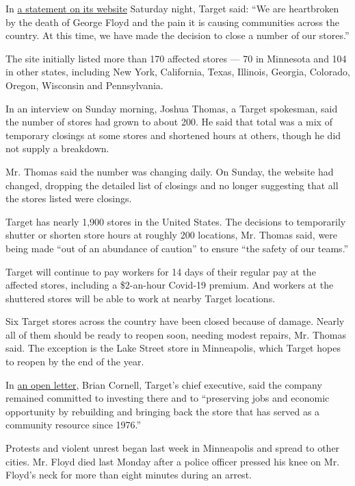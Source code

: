 In
\href{https://corporate.target.com/press/releases/2020/05/an-update-on-temporary-target-store-closures-due-t}{a
statement on its website} Saturday night, Target said: ``We are
heartbroken by the death of George Floyd and the pain it is causing
communities across the country. At this time, we have made the decision
to close a number of our stores.''

The site initially listed more than 170 affected stores --- 70 in
Minnesota and 104 in other states, including New York, California,
Texas, Illinois, Georgia, Colorado, Oregon, Wisconsin and Pennsylvania.

In an interview on Sunday morning, Joshua Thomas, a Target spokesman,
said the number of stores had grown to about 200. He said that total was
a mix of temporary closings at some stores and shortened hours at
others, though he did not supply a breakdown.

Mr. Thomas said the number was changing daily. On Sunday, the website
had changed, dropping the detailed list of closings and no longer
suggesting that all the stores listed were closings.

Target has nearly 1,900 stores in the United States. The decisions to
temporarily shutter or shorten store hours at roughly 200 locations, Mr.
Thomas said, were being made ``out of an abundance of caution'' to
ensure ``the safety of our teams.''

Target will continue to pay workers for 14 days of their regular pay at
the affected stores, including a \$2-an-hour Covid-19 premium. And
workers at the shuttered stores will be able to work at nearby Target
locations.

Six Target stores across the country have been closed because of damage.
Nearly all of them should be ready to reopen soon, needing modest
repairs, Mr. Thomas said. The exception is the Lake Street store in
Minneapolis, which Target hopes to reopen by the end of the year.

In
\href{https://corporate.target.com/article/2020/05/supporting-communities-minnesota-beyond}{an
open letter}, Brian Cornell, Target's chief executive, said the company
remained committed to investing there and to ``preserving jobs and
economic opportunity by rebuilding and bringing back the store that has
served as a community resource since 1976.''

Protests and violent unrest began last week in Minneapolis and spread to
other cities. Mr. Floyd died last Monday after a police officer pressed
his knee on Mr. Floyd's neck for more than eight minutes during an
arrest.

